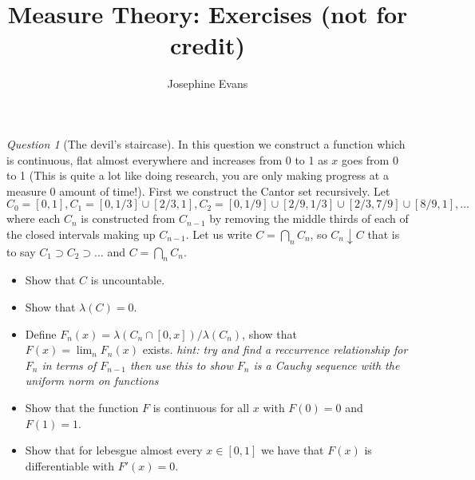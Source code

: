 \documentclass[11pt]{article}
\author{
Josephine Evans
}
\title{Measure Theory: Exercises (not for credit)}
\theoremstyle{definition}
\theoremstyle{remark}
\newtheorem{q}{Question}
\begin{document}
\maketitle

\begin{q}[The devil's staircase]
In this question we construct a function which is continuous, flat almost everywhere and increases from 0 to 1 as $x$ goes from 0 to 1 (This is quite a lot like doing research, you are only making progress at a measure 0 amount of time!). First we construct the Cantor set recursively. Let $C_0 = [0,1], C_1 = [0,1/3] \cup [2/3,1], C_2 = [0,1/9]\cup[2/9,1/3] \cup [2/3,7/9]\cup[8/9,1], \dots$ where each $C_n$ is constructed from $C_{n-1}$ by removing the middle thirds of each of the closed intervals making up $C_{n-1}$. Let us write $C= \bigcap_n C_n$, so $C_n \downarrow C$ that is to say $C_1 \supset C_2 \supset \dots$ and $C = \bigcap_n C_n$. 
\begin{itemize}
\item Show that $C$ is uncountable.
\item Show that $\lambda(C) =0$.
\item Define $F_n(x) = \lambda(C_n \cap [0,x])/\lambda(C_n)$, show that $F(x) = \lim_n F_n(x)$ exists. \emph{hint: try and find a reccurrence relationship for $F_n$ in terms of $F_{n-1}$ then use this to show $F_n$ is a Cauchy sequence with the uniform norm on functions}
\item Show that the function $F$ is continuous for all $x$ with $F(0) = 0$ and $F(1) = 1$.
\item Show that for lebesgue almost every $x \in [0,1]$ we have that $F(x)$ is differentiable with $F'(x) = 0$.
\end{itemize}
\end{q}
\end{document}
